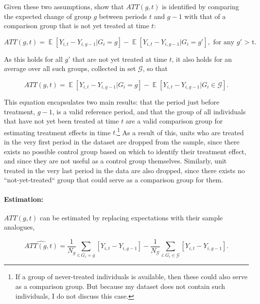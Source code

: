 Given these two assumptions, \citet{callaway2021difference} show that
$ATT(g,t)$ is identified by comparing the expected change of group $g$ between
periods $t$ and $g-1$ with that of a comparison group that is not yet treated
at time $t$:

\begin{equation}
    ATT(g,t) = \mathop{\mathbb{E}}[Y_{i,t} - Y_{i,g-1}|G_i = g] -
    \mathop{\mathbb{E}}[Y_{i,t} - Y_{i,g-1}|G_i = g'], \text{ for any $g'$ >
    t}.
\end{equation}

As this holds for all $g'$ that are not yet treated at time $t$, it also holds
for an average over all such groups, collected in set $\mathcal{G}$, so that

\begin{equation}
    ATT(g,t) = \mathop{\mathbb{E}}[Y_{i,t} - Y_{i,g-1}|G_i = g] -
    \mathop{\mathbb{E}}[Y_{i,t} - Y_{i,g-1}|G_i \in \mathcal{G}].
\end{equation}

This equation encapsulates two main results: that the period just before
treatment, $g-1$, is a valid reference period, and that the group of all
individuals that have not yet been treated at time $t$ are a valid comparison
group for estimating treatment effects in time $t$.\footnote{If a group of
never-treated individuals is available, then these could also serve as a
comparison group. But because my dataset does not contain such individuals, I
do not discuss this case.} As a result of this, units who are treated in the
very first period in the dataset are dropped from the sample, since there
exists no possible control group based on which to identify their treatment
effect, and since they are not useful as a control group themselves. Similarly,
unit treated in the very last period in the data are also dropped, since there
exists no ``not-yet-treated`` group that could serve as a comparison group for
them.


\paragraph{Estimation:}%
\label{par:estimation_}

$ATT(g,t)$ can be estimated by replacing expectations with their sample
analogues,

\begin{equation}
    \widehat{ATT(g,t)} = \frac{1}{N_g}\sum_{i:G_i=g}[Y_{i,t} - Y_{i, g-1}] -
    \frac{1}{N_\mathcal{G}}\sum_{i:G_i \in \mathcal{G}}[Y_{i,t} - Y_{i, g-1}].
\end{equation}

